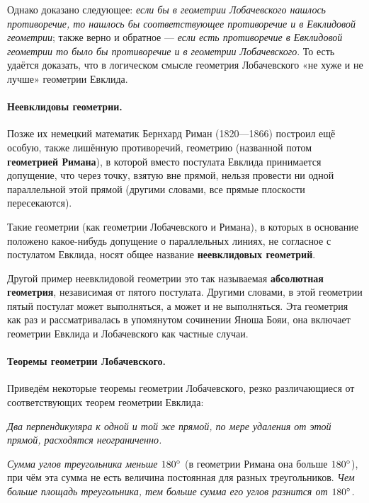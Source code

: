 Однако доказано следующее: \emph{если бы в геометрии Лобачевского нашлось противоречие, то нашлось бы соответствующее противоречие и в Евклидовой геометрии};
также верно и обратное --- \emph{если есть противоречие в Евклидовой геометрии то  было бы  противоречие и в геометрии Лобачевского}.
То есть удаётся доказать, что в логическом смысле геометрия Лобачевского «не хуже и не лучше» геометрии Евклида.


\paragraph{Неевклидовы геометрии.}\label{1914/94} 
Позже их немецкий математик Бернхард Риман (1820—1866) построил ещё особую, также лишённую противоречий, геометрию (названной потом \textbf{геометрией Римана}),
в которой вместо постулата Евклида принимается допущение, что
через точку, взятую вне прямой, нельзя провести ни одной параллельной этой прямой (другими словами, все прямые плоскости пересекаются).

Такие геометрии (как геометрии Лобачевского и Римана), в которых в основание положено какое-нибудь допущение о параллельных линиях, не согласное с постулатом Евклида, носят общее название
\textbf{неевклидовых геометрий}.

Другой пример неевклидовой геометрии это так называемая \textbf{абсолютная геометрия}, независимая от пятого постулата.
Другими словами, в этой геометрии пятый постулат может выполняться, а может и не выполняться.
Эта геометрия как раз и рассматривалась в упомянутом сочинении Яноша Бояи,
она включает геометрии Евклида и Лобачевского как частные случаи.

\paragraph{Теоремы геометрии Лобачевского.}\label{1914/95} Приведём некоторые теоремы геометрии Лобачевского, резко различающиеся от соответствующих теорем геометрии Евклида:

\emph{Два перпендикуляра к одной и той же прямой, по мере удаления
от этой прямой, расходятся неограниченно.}

\emph{Сумма углов треугольника меньше $180\degree$} (в геометрии Римана она
больше $180\degree$), при чём эта сумма не есть величина постоянная для разных треугольников.
\emph{Чем больше площадь треугольника, тем больше сумма его углов разнится от $180\degree$.}



